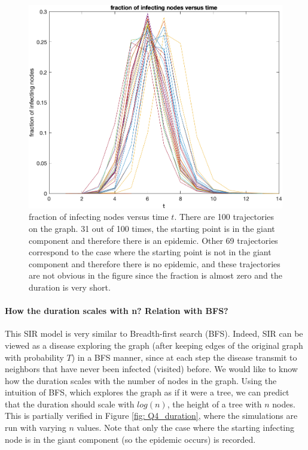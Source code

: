 \documentclass{article}
\begin{document}
 \begin{figure}[htp]
 	\centering
 	\includegraphics[width=.8\linewidth]{figs/Q4_fractionTime}
 	\caption{fraction of infecting nodes versus time $ t $. There are 100 trajectories on the graph. 31 out of 100 times, the starting point is in the giant component and therefore there is an epidemic.  Other 69 trajectories correspond to the case where the starting point is not in the giant component and therefore there is no epidemic, and these trajectories are not obvious in the figure since the fraction is almost zero and the duration is very short.  }
 	\label{fig: Q4_fractionTime}
 \end{figure}
 
\paragraph{How the duration scales with n? Relation with BFS?} 
This SIR model is very similar to Breadth-first search (BFS). Indeed, SIR can be viewed as a disease exploring the graph (after keeping edges of the original graph with probability $ T $) in a BFS manner, since at each step the disease transmit to neighbors that have never been infected (visited) before.
We would like to know how the duration scales with the number of nodes in the graph. Using the intuition of BFS, which explores the graph as if it were a tree, we can predict that the duration should scale with $ log(n) $, the height of a tree with $ n $ nodes. This is partially verified in Figure \ref{fig: Q4_duration}, where the simulations are run with varying $ n $ values. Note that only the case where the starting infecting node is in the giant component (so the epidemic occurs) is recorded.
\end{document}
